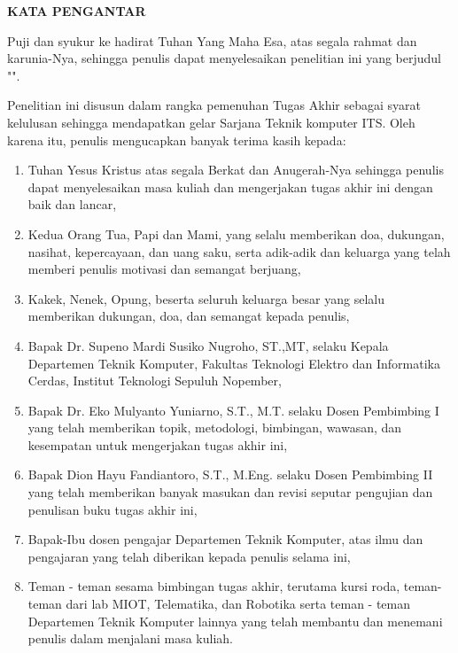 \begin{center}
  \Large
  \textbf{KATA PENGANTAR}
\end{center}


\vspace{2ex}


Puji dan syukur ke hadirat Tuhan Yang Maha Esa, atas segala rahmat dan karunia-Nya,
sehingga penulis dapat menyelesaikan penelitian ini yang berjudul
"\tatitle".

Penelitian ini disusun dalam rangka pemenuhan Tugas Akhir sebagai syarat kelulusan sehingga mendapatkan gelar Sarjana Teknik komputer ITS. Oleh karena itu, penulis mengucapkan banyak terima kasih kepada:

\begin{enumerate}[nolistsep]
  \item Tuhan Yesus Kristus atas segala Berkat dan Anugerah-Nya sehingga penulis dapat menyelesaikan masa kuliah dan mengerjakan tugas akhir ini dengan baik dan lancar,

  \item Kedua Orang Tua, Papi dan Mami, yang selalu memberikan doa, dukungan, nasihat, kepercayaan, dan uang saku, serta adik-adik dan keluarga yang telah memberi penulis motivasi dan semangat berjuang,
  
  \item Kakek, Nenek, Opung, beserta seluruh keluarga besar yang selalu memberikan dukungan, doa, dan semangat kepada penulis,

  \item Bapak Dr. Supeno Mardi Susiko Nugroho, ST.,MT, selaku Kepala Departemen Teknik Komputer, Fakultas Teknologi Elektro dan Informatika Cerdas, Institut Teknologi Sepuluh Nopember,

  \item Bapak Dr. Eko Mulyanto Yuniarno, S.T., M.T. selaku Dosen Pembimbing I yang telah memberikan topik, metodologi, bimbingan, wawasan, dan kesempatan untuk mengerjakan tugas akhir ini,

  \item Bapak Dion Hayu Fandiantoro, S.T., M.Eng. selaku Dosen Pembimbing II yang telah memberikan banyak masukan dan revisi seputar pengujian dan penulisan buku tugas akhir ini,

  \item Bapak-Ibu dosen pengajar Departemen Teknik Komputer, atas ilmu dan pengajaran yang telah diberikan kepada penulis selama ini,
  
  \item Teman - teman sesama bimbingan tugas akhir, terutama kursi roda, teman-teman dari lab MIOT, Telematika, dan Robotika serta teman - teman Departemen Teknik Komputer lainnya yang telah membantu dan menemani penulis dalam menjalani masa kuliah.

\end{enumerate}

